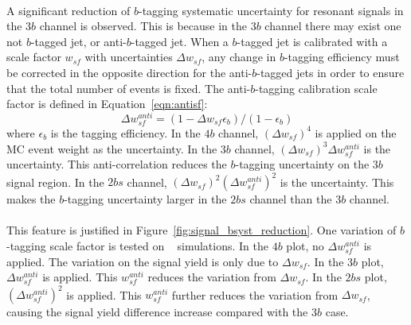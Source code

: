 \paragraph{}
A significant reduction of $b$-tagging systematic uncertainty for resonant signals in the $3b$ channel is observed. 
This is because in the $3b$ channel there may exist one not $b$-tagged jet, or anti-$b$-tagged jet.
When a $b$-tagged jet is calibrated with a scale factor $w_{sf}$ with uncertainties $\Delta w_{sf}$, any change in $b$-tagging efficiency must be corrected in the opposite direction for the anti-$b$-tagged jets in order to ensure that the total number of events is fixed. 
The anti-$b$-tagging calibration scale factor is defined in Equation~\ref{eqn:antisf}:
\begin{equation}
\label{eqn:antisf}
\Delta  w_{sf}^{anti} = (1 - \Delta  w_{sf} \epsilon_{b}) / (1 - \epsilon_{b})
\end{equation}
where $\epsilon_{b}$ is the tagging efficiency.
In the $4b$ channel, $(\Delta w_{sf})^4$ is applied on the MC event weight as the uncertainty.
In the $3b$ channel, $(\Delta w_{sf})^3 \Delta  w_{sf}^{anti} $ is the uncertainty.
This anti-correlation reduces the $b$-tagging uncertainty on the $3b$ signal region. 
In the $2bs$ channel, $(\Delta w_{sf})^2 (\Delta  w_{sf}^{anti})^2 $ is the uncertainty.
This makes the $b$-tagging uncertainty larger in the $2bs$ channel than the $3b$ channel.

\paragraph{}
This feature is justified in Figure~\ref{fig:signal_bsyst_reduction}.
One variation of $b$-tagging scale factor is tested on \Grav~ simulations.
In the $4b$ plot, no $\Delta  w_{sf}^{anti}$ is applied. 
The variation on the signal yield is only due to $\Delta w_{sf}$.
In the $3b$ plot, $\Delta  w_{sf}^{anti}$ is applied. 
This $w_{sf}^{anti}$ reduces the variation from $\Delta w_{sf}$.
In the $2bs$ plot, $(\Delta  w_{sf}^{anti})^2$ is applied. 
This $w_{sf}^{anti}$ further reduces the variation from $\Delta w_{sf}$, causing the signal yield difference increase compared with the $3b$ case.

